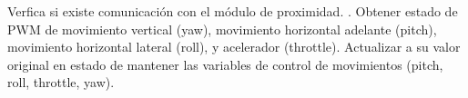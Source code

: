 
\begin{UCtrayectoria}
	\UCpaso [\UCactor] Verfica si existe comunicación con el módulo de 
		proximidad. .
	\UCpaso Obtener estado de PWM de movimiento vertical (yaw), movimiento 
	horizontal adelante (pitch), movimiento horizontal lateral (roll), 
	y acelerador (throttle).
	\UCpaso Actualizar a su valor original en estado de mantener las 
	variables de control de movimientos (pitch, roll, throttle, yaw).
\end{UCtrayectoria}








